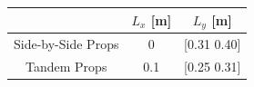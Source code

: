 \begin{frame}{\subsecname}
\begin{figure} [H]
{  }
\end{figure} 
\vspace{-0.5cm}
 \begin{table}[H]
                \centering 
                \begin{tabular}{|c c c |}
                \hline
                \rowcolor{bluePoli!40 } %
                  & $L_x$ [m] & $L_y$ [m]  \T\B \\
                \hline \hline
                Side-by-Side Props & 0 & [0.31 0.40]\T\B  \\
                Tandem Props & 0.1 & [0.25 0.31]\T\B  \\
                \hline
                \end{tabular}
    \end{table}
\end{frame}

